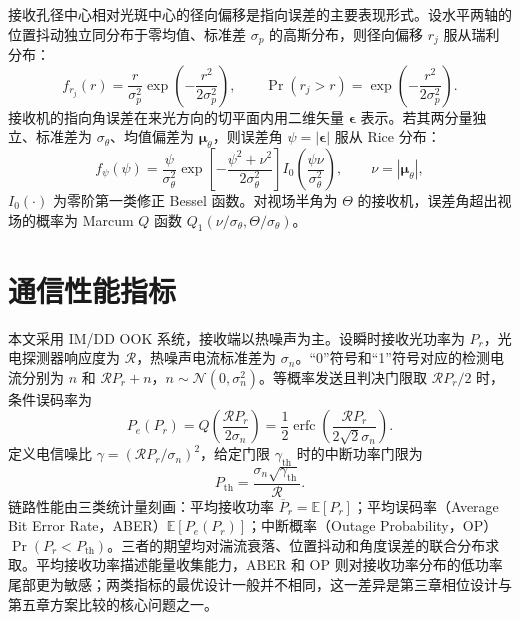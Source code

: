接收孔径中心相对光斑中心的径向偏移是指向误差的主要表现形式。设水平两轴的位置抖动独立同分布于零均值、标准差 $\sigma_p$ 的高斯分布，则径向偏移 $r_j$ 服从瑞利分布：
\begin{equation}
f_{r_j}(r)=\frac{r}{\sigma_p^2}\exp\!\left(-\frac{r^2}{2\sigma_p^2}\right),\qquad
\Pr(r_j>r)=\exp\!\left(-\frac{r^2}{2\sigma_p^2}\right).
\label{eq:c2_rayleigh}
\end{equation}
接收机的指向角误差在来光方向的切平面内用二维矢量 $\boldsymbol\epsilon$ 表示。若其两分量独立、标准差为 $\sigma_\theta$、均值偏差为 $\boldsymbol\mu_\theta$，则误差角 $\psi=|\boldsymbol\epsilon|$ 服从 Rice 分布：
\begin{equation}
f_\psi(\psi)=\frac{\psi}{\sigma_\theta^2}\exp\!\left[-\frac{\psi^2+\nu^2}{2\sigma_\theta^2}\right]I_0\!\left(\frac{\psi\nu}{\sigma_\theta^2}\right),\qquad \nu=|\boldsymbol\mu_\theta|,
\label{eq:c2_rice}
\end{equation}
$I_0(\cdot)$ 为零阶第一类修正 Bessel 函数。对视场半角为 $\Theta$ 的接收机，误差角超出视场的概率为 Marcum $Q$ 函数 $Q_1(\nu/\sigma_\theta,\Theta/\sigma_\theta)$。

\section{通信性能指标}
\label{sec:c2_metrics}

本文采用 IM/DD OOK 系统，接收端以热噪声为主。设瞬时接收光功率为 $P_r$，光电探测器响应度为 $\mathcal R$，热噪声电流标准差为 $\sigma_n$。“0”符号和“1”符号对应的检测电流分别为 $n$ 和 $\mathcal RP_r+n$，$n\sim\mathcal N(0,\sigma_n^2)$。等概率发送且判决门限取 $\mathcal RP_r/2$ 时，条件误码率为
\begin{equation}
P_e(P_r)=Q\!\left(\frac{\mathcal RP_r}{2\sigma_n}\right)=\frac12\operatorname{erfc}\!\left(\frac{\mathcal RP_r}{2\sqrt2\sigma_n}\right).
\label{eq:c2_ber}
\end{equation}
定义电信噪比 $\gamma=(\mathcal RP_r/\sigma_n)^2$，给定门限 $\gamma_{\mathrm{th}}$ 时的中断功率门限为
\begin{equation}
P_{\mathrm{th}}=\frac{\sigma_n\sqrt{\gamma_{\mathrm{th}}}}{\mathcal R}.
\label{eq:c2_pth}
\end{equation}
链路性能由三类统计量刻画：平均接收功率 $\overline P_r=\mathbb E[P_r]$；平均误码率（Average Bit Error Rate，ABER）$\mathbb E[P_e(P_r)]$；中断概率（Outage Probability，OP）$\Pr(P_r<P_{\mathrm{th}})$。三者的期望均对湍流衰落、位置抖动和角度误差的联合分布求取。平均接收功率描述能量收集能力，ABER 和 OP 则对接收功率分布的低功率尾部更为敏感；两类指标的最优设计一般并不相同，这一差异是第三章相位设计与第五章方案比较的核心问题之一。

